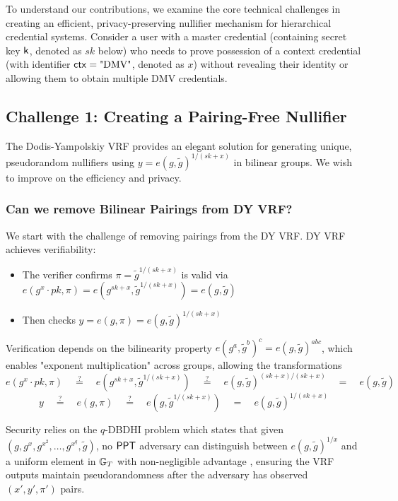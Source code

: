 To understand our contributions, we examine the core technical challenges in creating an efficient, privacy-preserving nullifier mechanism for hierarchical credential systems. Consider a user with a master credential (containing secret key $\mathsf{k}$, denoted as $sk$ below) who needs to prove possession of a context credential (with identifier $\mathsf{ctx} = \text{"DMV"}$, denoted as $x$) without revealing their identity or allowing them to obtain multiple DMV credentials.

\subsection{Challenge 1: Creating a Pairing-Free Nullifier}

The Dodis-Yampolskiy \cite{hutchison_verifiable_2005} VRF provides an elegant solution for generating unique, pseudorandom nullifiers using $y = e(g, \tilde{g})^{1/(sk+x)}$ in bilinear groups. We wish to improve on the efficiency and privacy. 

\subsubsection{Can we remove Bilinear Pairings from DY VRF?}

We start with the challenge of removing pairings from the DY VRF. DY VRF achieves verifiability:

\begin{itemize}
    \item The verifier confirms $\pi = \tilde{g}^{1/(sk+x)}$ is valid via $e(g^x \cdot pk, \pi) = e(g^{sk+x}, \tilde{g}^{1/(sk+x)}) = e(g, \tilde{g})$
    \item Then checks $y = e(g, \pi) = e(g, \tilde{g})^{1/(sk+x)}$
\end{itemize}

Verification depends on the bilinearity property $e(g^a, \tilde{g}^b)^c = e(g, \tilde{g})^{abc}$, which enables "exponent multiplication" across groups, allowing the transformations
\[
e(g^x \cdot pk, \pi) \quad \stackrel{?}{=} \quad e(g^{sk+x}, \tilde{g}^{1/(sk+x)}) \quad \stackrel{?}{=} \quad 
 e(g, \tilde{g})^{(sk+x)/(sk+x)} \quad  \stackrel{}{=} \quad e(g, \tilde{g})
\]
\[
y \quad \stackrel{?}{=} \quad e(g, \pi) \quad \stackrel{?}{=} \quad e(g,\tilde{g}^{1/(sk+x)}) \quad \stackrel{}{=} \quad e(g, \tilde{g})^{1/(sk+x)}
\]

Security relies on the $q$-DBDHI problem which states that given $(g, g^x, g^{x^2}, \ldots, g^{x^q}, \tilde{g})$, no $\mathsf{PPT}$ adversary can distinguish between $e(g,\tilde{g})^{1/x}$ and a uniform element in $\mathbb{G}_T$ with non-negligible advantage , ensuring the VRF outputs maintain pseudorandomness after the adversary has observed $(x',y',\pi')$ pairs.


